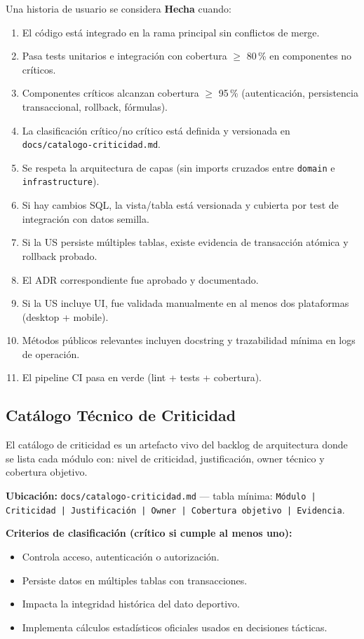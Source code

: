 \documentclass[11pt,a4paper]{article}
\newcommand{\fpath}[1]{\texttt{\small #1}}
\begin{document}
Una historia de usuario se considera \textbf{Hecha} cuando:
\begin{enumerate}[nosep]
  \item El código está integrado en la rama principal sin conflictos de merge.
  \item Pasa tests unitarios e integración con cobertura $\geq$ 80\,\% en componentes no críticos.
  \item Componentes críticos alcanzan cobertura $\geq$ 95\,\% (autenticación, persistencia transaccional, rollback, fórmulas).
  \item La clasificación crítico/no crítico está definida y versionada en \fpath{docs/catalogo-criticidad.md}.
  \item Se respeta la arquitectura de capas (sin imports cruzados entre \fpath{domain} e \fpath{infrastructure}).
  \item Si hay cambios SQL, la vista/tabla está versionada y cubierta por test de integración con datos semilla.
  \item Si la US persiste múltiples tablas, existe evidencia de transacción atómica y rollback probado.
  \item El ADR correspondiente fue aprobado y documentado.
  \item Si la US incluye UI, fue validada manualmente en al menos dos plataformas (desktop + mobile).
  \item Métodos públicos relevantes incluyen docstring y trazabilidad mínima en logs de operación.
  \item El pipeline CI pasa en verde (lint + tests + cobertura).
\end{enumerate}

\subsection{Catálogo Técnico de Criticidad}
El catálogo de criticidad es un artefacto vivo del backlog de arquitectura donde se lista cada módulo con: nivel de criticidad, justificación, owner técnico y cobertura objetivo.

\textbf{Ubicación:} \fpath{docs/catalogo-criticidad.md} — tabla mínima: \texttt{Módulo | Criticidad | Justificación | Owner | Cobertura objetivo | Evidencia}.

\textbf{Criterios de clasificación (crítico si cumple al menos uno):}
\begin{itemize}[nosep]
  \item Controla acceso, autenticación o autorización.
  \item Persiste datos en múltiples tablas con transacciones.
  \item Impacta la integridad histórica del dato deportivo.
  \item Implementa cálculos estadísticos oficiales usados en decisiones tácticas.
\end{itemize}
\end{document}
